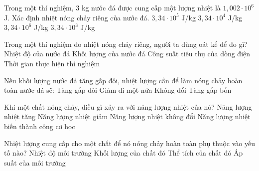 \begin{ex}
Trong một thí nghiệm, 3 kg nước đá được cung cấp một lượng nhiệt là $1,002 \cdot 10^6$ J. Xác định nhiệt nóng chảy riêng của nước đá.
\choice
{\True $3,34 \cdot 10^5$ J/kg}
{$3,34 \cdot 10^4$ J/kg}
{$3,34 \cdot 10^6$ J/kg}
{$3,34 \cdot 10^3$ J/kg}
\end{ex}

\begin{ex}
Trong một thí nghiệm đo nhiệt nóng chảy riêng, người ta dùng oát kế để đo gì?
\choice
{Nhiệt độ của nước đá}
{Khối lượng của nước đá}
{\True Công suất tiêu thụ của dòng điện}
{Thời gian thực hiện thí nghiệm}
\end{ex}

\begin{ex}
Nếu khối lượng nước đá tăng gấp đôi, nhiệt lượng cần để làm nóng chảy hoàn toàn nước đá sẽ:
\choice
{\True Tăng gấp đôi}
{Giảm đi một nửa}
{Không đổi}
{Tăng gấp bốn}
\end{ex}

\begin{ex}
Khi một chất nóng chảy, điều gì xảy ra với năng lượng nhiệt của nó?
\choice
{\True Năng lượng nhiệt tăng}
{Năng lượng nhiệt giảm}
{Năng lượng nhiệt không đổi}
{Năng lượng nhiệt biến thành công cơ học}
\end{ex}

\begin{ex}
Nhiệt lượng cung cấp cho một chất để nó nóng chảy hoàn toàn phụ thuộc vào yếu tố nào?
\choice
{Nhiệt độ môi trường}
{\True Khối lượng của chất đó}
{Thể tích của chất đó}
{Áp suất của môi trường}
\end{ex}

